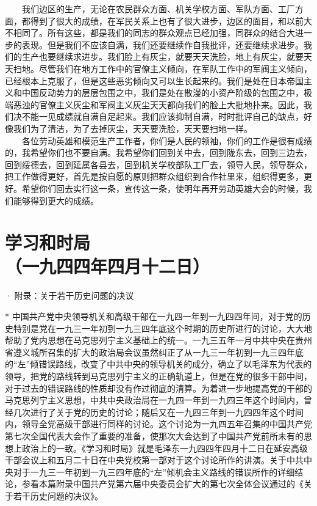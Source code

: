 \documentclass[cn,11pt,chinese]{elegantbook}
\def\myformat#1{\hfil\hfil #1}
\begin{document}
　　我们边区的生产，无论在农民群众方面、机关学校方面、军队方面、工厂方面，都得到了很大的成绩，在军民关系上也有了很大进步，边区的面目，和以前大不相同了。所有这些，都是我们的同志的群众观点已经加强，同群众的结合大进一步的表现。但是我们不应该自满，我们还要继续作自我批评，还要继续求进步。我们的生产也要继续求进步。我们脸上有灰尘，就要天天洗脸，地上有灰尘，就要天天扫地。尽管我们在地方工作中的官僚主义倾向，在军队工作中的军阀主义倾向，已经根本上克服了，但是这些恶劣倾向又可以生长起来的。我们是处在日本帝国主义和中国反动势力的层层包围之中，我们是处在散漫的小资产阶级的包围之中，极端恶浊的官僚主义灰尘和军阀主义灰尘天天都向我们的脸上大批地扑来。因此，我们决不能一见成绩就自满自足起来。我们应该抑制自满，时时批评自己的缺点，好像我们为了清洁，为了去掉灰尘，天天要洗脸，天天要扫地一样。\\
　　各位劳动英雄和模范生产工作者，你们是人民的领袖，你们的工作是很有成绩的，我希望你们也不要自满。我希望你们回到关中去，回到陇东去，回到三边去，回到绥德去，回到延属各县去，回到机关学校部队工厂去，领导人民，领导群众，把工作做得更好，首先是按自愿的原则把群众组织到合作社里来，组织得更多，更好。希望你们回去实行这一条，宣传这一条，使明年再开劳动英雄大会的时候，我们能够得到更大的成绩。\\
\newpage\section*{\myformat{学习和时局}\\\myformat{（一九四四年四月十二日）}}
\begin{introduction}\item · 附录：关于若干历史问题的决议\end{introduction}
* 中国共产党中央领导机关和高级干部在一九四一年到一九四四年间，对于党的历史特别是党在一九三一年初到一九三四年底这个时期的历史所进行的讨论，大大地帮助了党内思想在马克思列宁主义基础上的统一。一九三五年一月中共中央在贵州省遵义城所召集的扩大的政治局会议虽然纠正了从一九三一年初到一九三四年底的“左”倾错误路线，改变了中共中央的领导机关的成分，确立了以毛泽东为代表的领导，把党的路线转到马克思列宁主义的正确轨道上，但是在党的很多干部中间，对于过去的错误路线的性质却没有作过彻底的清算。为着进一步地提高党的干部的马克思列宁主义思想，中共中央政治局在一九四一年到一九四三年这个时间内，曾经几次进行了关于党的历史的讨论；随后又在一九四三年到一九四四年这个时间内，领导全党高级干部进行同样的讨论。这个讨论为一九四五年召集的中国共产党第七次全国代表大会作了重要的准备，使那次大会达到了中国共产党前所未有的思想上政治上的一致。《学习和时局》就是毛泽东一九四四年四月十二日在延安高级干部会议上和五月二十日在中央党校第一部对于这个讨论所作的讲演。关于中共中央对于一九三一年初到一九三四年底的“左”倾机会主义路线的错误所作的详细结论，参看本篇附录中国共产党第六届中央委员会扩大的第七次全体会议通过的《关于若干历史问题的决议》。\\
\end{document}
